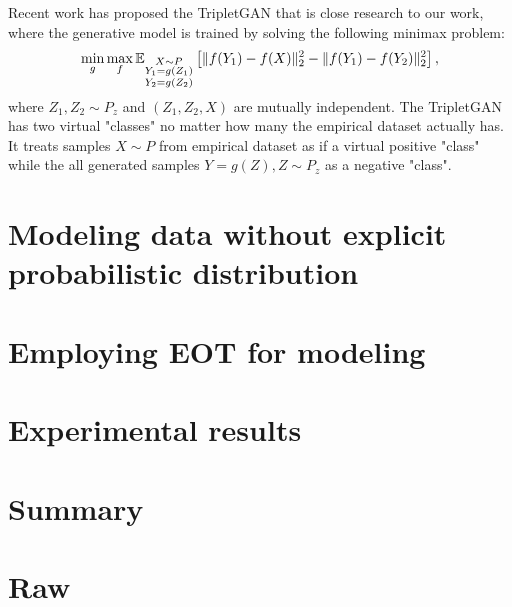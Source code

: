 
Recent work \cite{2017arXiv171105084C} has proposed 
the TripletGAN that is close research to
our work, where the generative model is trained by solving the
following minimax problem:
\begin{equation}
  \min_{g} \max_{f} \mathbb{E}_{{\substack{X\sim P \\ Y_1= g(Z_1)\\ Y_2 = g(Z_2)}}}\left[ \| f(Y_1)-f(X) \|_{2}^2 - \| f(Y_1)-f(Y_2) \|_{2}^2 \right],
\end{equation}
where $Z_1, Z_2 \sim P_z$ and $(Z_1,Z_2,X)$ are mutually independent. The TripletGAN has two virtual
"classes" no matter how many the empirical dataset actually has. It treats samples
$X\sim P$ from empirical dataset as if a virtual positive "class" while the all
generated samples $Y=g(Z), Z\sim P_z$ as a negative "class". 


\section{Modeling data without explicit probabilistic distribution}

\section{Employing EOT for modeling}

\section{Experimental results}

\section{Summary}
\section{Raw}
